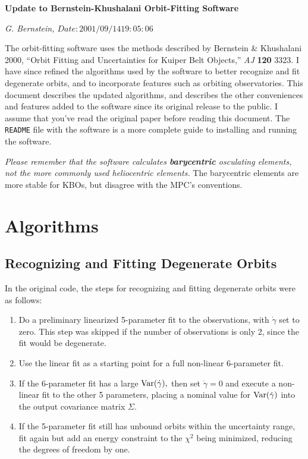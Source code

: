 \textwidth=7.0in
\oddsidemargin=-0.25in

\begin{center}

\bf Update to Bernstein-Khushalani Orbit-Fitting Software

\em G. Bernstein, $Date: 2001/09/14 19:05:06 $

\end{center}


The orbit-fitting software uses the methods described by Bernstein \&
Khushalani 2000, ``Orbit Fitting and Uncertainties for
Kuiper Belt Objects,'' {\em AJ} {\bf 120} 3323.  I have since refined
the algorithms used by the software to better recognize and fit
degenerate orbits, and to incorporate features such as orbiting
observatories. This document describes the updated algorithms, and
describes the other conveniences and features added to the software
since its original release to the public.  I assume that you've read
the original paper before reading this document.  The {\tt README}
file with the software is a more complete guide to installing and
running the software.

{\em Please remember that the software calculates {\bf barycentric}
osculating elements, not the more commonly used heliocentric
elements.}  The barycentric elements are more stable for KBOs, but
disagree with the MPC's conventions.

\section{Algorithms}
\subsection{Recognizing and Fitting Degenerate Orbits}
In the original code, the steps for recognizing and fitting degenerate
orbits were as follows:
\begin{enumerate}
\item Do a preliminary linearized 5-parameter fit to the observations,
with $\dot\gamma$ set to zero.  This step was skipped if the number of
observations is only 2, since the fit would be degenerate.
\item Use the linear fit as a starting point for a full non-linear
6-parameter fit.
\item If the 6-parameter fit has a large ${\rm Var}(\dot\gamma),$ then
set $\dot\gamma=0$ and execute a non-linear fit to the other 5
parameters, placing a nominal value for ${\rm Var}(\dot\gamma)$ into
the output covariance matrix $\Sigma$.  
\item If the 5-parameter fit still has unbound orbits within the
uncertainty range, fit again but add an energy constraint to the
$\chi^2$ being minimized, reducing the degrees of freedom by one.
\end{enumerate}

